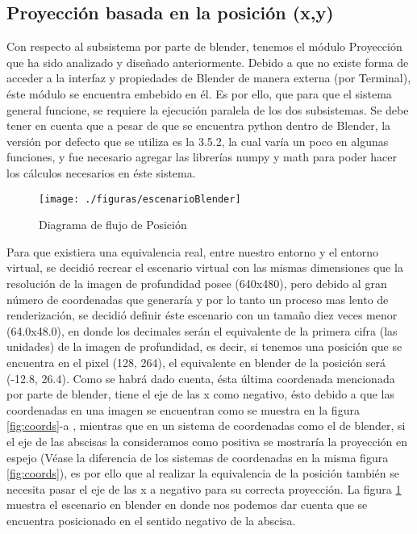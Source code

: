 \documentclass[a4paper,openright,12pt]{report}
\begin{document}
\subsection{Proyección basada en la posición (x,y)}
Con respecto al subsistema por parte de blender, tenemos el módulo Proyección que ha sido analizado y diseñado anteriormente. Debido a que no existe forma de acceder a la interfaz y propiedades de Blender de manera externa (por Terminal), éste módulo se encuentra embebido en él. Es por ello, que para que el sistema general funcione, se requiere la ejecución paralela de los dos subsistemas. Se debe tener en cuenta que a pesar de que se encuentra python dentro de Blender, la versión por defecto que se utiliza es la 3.5.2, la cual varía un poco en algunas funciones, y fue necesario agregar las librerías numpy y math para poder hacer los cálculos necesarios en éste sistema.\\
\begin{figure}[thb]
	\centering
	\texttt{[image: ./figuras/escenarioBlender]}
	\caption{Diagrama de flujo de Posición} \label{fig:escenarioBlender}
\end{figure}
Para que existiera una equivalencia real, entre nuestro entorno y el entorno virtual, se decidió recrear el escenario virtual con las mismas dimensiones que la resolución de la imagen de profundidad posee (640x480), pero debido al gran número de coordenadas que generaría y por lo tanto un proceso mas lento de renderización, se decidió definir éste escenario con un tamaño diez veces menor (64.0x48.0), en donde los decimales serán el equivalente de la primera cifra (las unidades) de la imagen de profundidad, es decir, si tenemos una posición que se encuentra en el pixel (128, 264), el equivalente en blender de la posición será (-12.8, 26.4). Como se habrá dado cuenta, ésta última coordenada mencionada por parte de blender, tiene el eje de las x como negativo, ésto debido a que las coordenadas en una imagen se encuentran como se muestra en la figura  \ref{fig:coords}-a , mientras que en un sistema de coordenadas como el de blender, si el eje de las abscisas la consideramos como positiva se mostraría la proyección en espejo (Véase la diferencia de los sistemas de coordenadas en la misma figura \ref{fig:coords}), es por ello que al realizar la equivalencia de la posición también se necesita pasar el eje de las x a negativo para su correcta proyección. La figura \ref{fig:escenarioBlender} muestra el escenario en blender en donde nos podemos dar cuenta que se encuentra posicionado en el sentido negativo de la abscisa.\\
\end{document}
